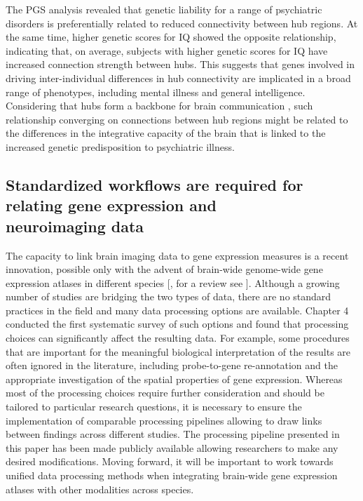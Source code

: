 The PGS analysis revealed that genetic liability for a range of psychiatric disorders is preferentially related to reduced connectivity between hub regions. At the same time, higher genetic scores for IQ showed the opposite relationship, indicating that, on average, subjects with higher genetic scores for IQ have increased connection strength between hubs. This suggests that genes involved in driving inter-individual differences in hub connectivity are implicated in a broad range of phenotypes, including mental illness and general intelligence.
Considering that hubs form a backbone for brain communication \citep{Harriger2012, VandenHeuvel2011,VandenHeuvel2013b}, such relationship converging on connections between hub regions might be related to the differences in the integrative capacity of the brain that is linked to the increased genetic predisposition to psychiatric illness.

\subsection*{Standardized workflows are required for relating gene expression and \\neuroimaging data}

The capacity to link brain imaging data to gene expression measures is a recent innovation, possible only with the advent of brain-wide genome-wide gene expression atlases in different species [\citep{Harris2010,Hawrylycz2012,Lein2007a}, for a review see \citep{Keil2018}]. Although a growing number of studies are bridging the two types of data, there are no standard practices in the field and many data processing options are available. Chapter 4 conducted the first systematic survey of such options and found that processing choices can significantly affect the resulting data. For example, some procedures that are important for the meaningful biological interpretation of the results are often ignored in the literature, including  probe-to-gene re-annotation and the appropriate investigation of the spatial properties of gene expression. Whereas most of the processing choices require further consideration and should be tailored to particular research questions, it is necessary to ensure the implementation of comparable processing pipelines allowing to draw links between findings across different studies. The processing pipeline presented in this paper has been made publicly available allowing researchers to make any desired modifications. Moving forward, it will be important to work towards unified data processing methods when integrating brain-wide gene expression atlases with other modalities across species. 

